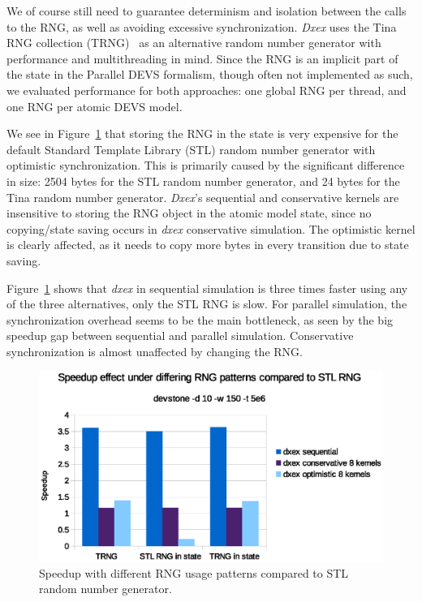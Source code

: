 We of course still need to guarantee determinism and isolation between the calls to the RNG, as well as avoiding excessive synchronization.
\textit{Dxex} uses the Tina RNG collection (TRNG)~\cite{PhysRevE.75.066701} as an alternative random number generator with performance and multithreading in mind.
Since the RNG is an implicit part of the state in the \textsf{Parallel DEVS} formalism, though often not implemented as such, we evaluated performance for both approaches: one global RNG per thread, and one RNG per atomic \textsf{DEVS} model.

We see in Figure~\ref{fig:Queuerngspeedup} that storing the RNG in the state is very expensive for the default Standard Template Library (STL) random number generator with optimistic synchronization.
This is primarily caused by the significant difference in size: 2504 bytes for the STL random number generator, and 24 bytes for the Tina random number generator.
\textit{Dxex}'s sequential and conservative kernels are insensitive to storing the RNG object in the atomic model state, since no copying/state saving occurs in \textit{dxex} conservative simulation.
The optimistic kernel is clearly affected, as it needs to copy more bytes in every transition due to state saving.

Figure~\ref{fig:Queuerngspeedup} shows that \textit{dxex} in sequential simulation is three times faster using any of the three alternatives, only the STL RNG is slow.
For parallel simulation, the synchronization overhead seems to be the main bottleneck, as seen by the big speedup gap between sequential and parallel simulation.
Conservative synchronization is almost unaffected by changing the RNG.

\begin{figure}
    \center
    \includegraphics[width=\columnwidth]{fig/rngspeedupeffectdevstone.eps}
    \caption{Speedup with different RNG usage patterns compared to STL random number generator.}
    \label{fig:Queuerngspeedup}
\end{figure}
